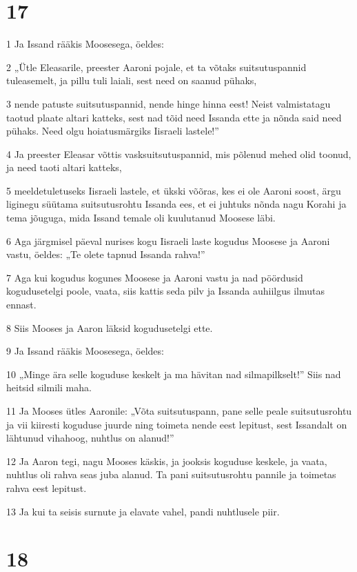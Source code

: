 \chapter{17}

\par 1 Ja Issand rääkis Moosesega, öeldes:
\par 2 „Ütle Eleasarile, preester Aaroni pojale, et ta võtaks suitsutuspannid tuleasemelt, ja pillu tuli laiali, sest need on saanud pühaks,
\par 3 nende patuste suitsutuspannid, nende hinge hinna eest! Neist valmistatagu taotud plaate altari katteks, sest nad tõid need Issanda ette ja nõnda said need pühaks. Need olgu hoiatusmärgiks Iisraeli lastele!”
\par 4 Ja preester Eleasar võttis vasksuitsutuspannid, mis põlenud mehed olid toonud, ja need taoti altari katteks,
\par 5 meeldetuletuseks Iisraeli lastele, et ükski võõras, kes ei ole Aaroni soost, ärgu liginegu süütama suitsutusrohtu Issanda ees, et ei juhtuks nõnda nagu Korahi ja tema jõuguga, mida Issand temale oli kuulutanud Moosese läbi.
\par 6 Aga järgmisel päeval nurises kogu Iisraeli laste kogudus Moosese ja Aaroni vastu, öeldes: „Te olete tapnud Issanda rahva!”
\par 7 Aga kui kogudus kogunes Moosese ja Aaroni vastu ja nad pöördusid kogudusetelgi poole, vaata, siis kattis seda pilv ja Issanda auhiilgus ilmutas ennast.
\par 8 Siis Mooses ja Aaron läksid kogudusetelgi ette.
\par 9 Ja Issand rääkis Moosesega, öeldes:
\par 10 „Minge ära selle koguduse keskelt ja ma hävitan nad silmapilkselt!” Siis nad heitsid silmili maha.
\par 11 Ja Mooses ütles Aaronile: „Võta suitsutuspann, pane selle peale suitsutusrohtu ja vii kiiresti koguduse juurde ning toimeta nende eest lepitust, sest Issandalt on lähtunud vihahoog, nuhtlus on alanud!”
\par 12 Ja Aaron tegi, nagu Mooses käskis, ja jooksis koguduse keskele, ja vaata, nuhtlus oli rahva seas juba alanud. Ta pani suitsutusrohtu pannile ja toimetas rahva eest lepitust.
\par 13 Ja kui ta seisis surnute ja elavate vahel, pandi nuhtlusele piir.

\chapter{18}


